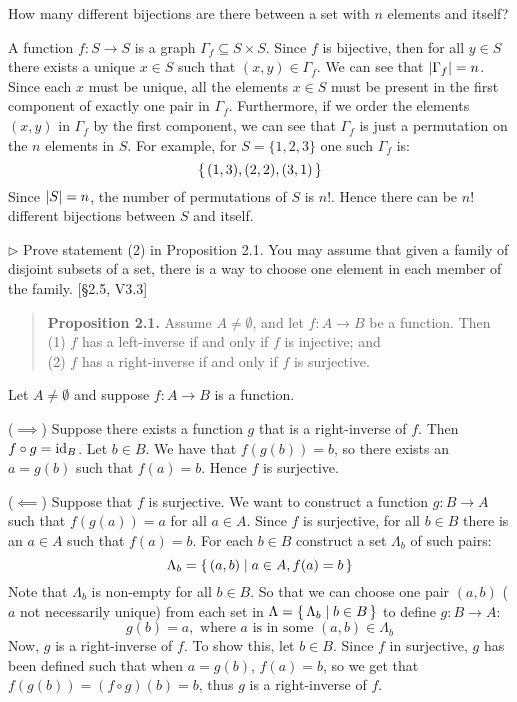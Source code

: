 \begin{problem}
  How many different bijections are there between a set with $n$ elements
  and itself?
\end{problem}
\begin{solution}
  A function $f:S\to S$ is a graph $\Gamma_f\subseteq S\times S$. Since $f$ is
  bijective, then for all $y\in S$ there exists a unique $x\in S$ such that
  $(x,y)\in\Gamma_f$. We can see that $\left|\Gamma_f\right| = n$. Since each $x$ must
  be unique, all the elements $x\in S$ must be present in the first component
  of exactly one pair in $\Gamma_f$. Furthermore, if we order the elements
  $(x,y)$ in $\Gamma_f$ by the first component, we can see that $\Gamma_f$ is just a permutation on the $n$ elements in $S$. For example, for $S=\{1,2,3\}$ one such $\Gamma_f$ is:
  \[ \left\{\, (1,3), (2,2), (3,1) \,\right\} \]
  Since $\left|S\right| = n$, the number of permutations of $S$ is $n!$. Hence there
  can be $n!$ different bijections between $S$ and itself.
\end{solution}

\begin{problem}
  $\rhd$ Prove statement (2) in Proposition 2.1. You may assume that given a
  family of disjoint subsets of a set, there is a way to choose one element
  in each member of the family. [\S2.5, V3.3]

  \begin{quote}
    \textbf{Proposition 2.1.} Assume $A\neq\emptyset$, and let $f:A\to B$ be
    a function. Then \\
      (1) $f$ has a left-inverse if and only if $f$ is injective; and \\
      (2) $f$ has a right-inverse if and only if $f$ is surjective.
  \end{quote}
\end{problem}
\begin{solution}
  Let $A\neq\emptyset$ and suppose $f:A\to B$ is a function.

  ($\implies$) Suppose there exists a function $g$ that is a right-inverse of
  $f$. Then $f\circ g = \mathrm{id}_B$. Let $b\in B$. We have that $f(g(b)) = b$, so
  there exists an $a = g(b)$ such that $f(a) = b$. Hence $f$ is surjective.

  ($\impliedby$) Suppose that $f$ is surjective. We want to construct a function
  $g:B\to A$ such that $f(g(a)) = a$ for all $a\in A$. Since $f$ is surjective,
  for all $b\in B$ there is an $a\in A$ such that $f(a) = b$. For each $b\in B$
  construct a set $\Lambda_b$ of such pairs:
  \[ \Lambda_b = \left\{\, (a,b) \mid a \in A, f(a) = b \,\right\} \]
  Note that $\Lambda_b$ is non-empty for all $b\in B$. So that we can choose one
  pair $(a,b)$ ($a$ not necessarily unique) from each set in $\Lambda =
  \left\{\,\Lambda_b\mid b\in B\,\right\}$ to define $g:B\to A$:
  \[ g(b) = a, \text{ where $a$ is in some $(a,b)\in\Lambda_b$} \]
  Now, $g$ is a right-inverse of $f$. To show this, let $b\in B$. Since $f$ in
  surjective, $g$ has been defined such that when $a=g(b)$, $f(a)=b$, so we get
  that $f(g(b)) = (f\circ g)(b) = b$, thus $g$ is a right-inverse of $f$.
\end{solution}

